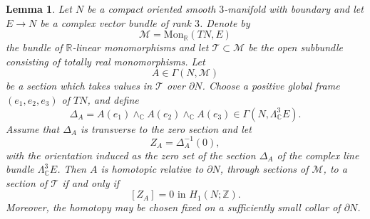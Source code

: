 \documentclass[10pt,a4paper]{amsart}
\newtheorem{lemma}{Lemma}
\newcommand{\C}{\mathbb{C}}
\newcommand\Mon{\mathrm{Mon}}
\newcommand{\R}{\mathbb{R}}
\newcommand{\Z}{\mathbb{Z}}
\newcommand{\cM}{\mathcal{M}}
\newcommand{\cT}{\mathcal{T}}
\begin{document}
\begin{lemma}\label{lemma}
Let $N$ be a compact oriented smooth $3$-manifold with boundary and let $E\to N$ be a complex vector bundle of rank $3$. Denote by 
\[\cM=\Mon_{\R}(TN,E)\] 
the bundle of $\R$-linear monomorphisms and let $\cT\subset \cM$ be the open subbundle consisting of totally real monomorphisms. Let
\[A\in \Gamma(N,\mathcal M)\]
be a section which takes values in $\cT$ over $\partial N$.  Choose a positive global frame $(e_1,e_2,e_3)$ of $TN$, and define
\[\Delta_A=A(e_1)\wedge_{\C} A(e_2)\wedge_{\C} A(e_3)
        \in \Gamma\left(N,\Lambda^3_{\C}E\right).\]
Assume that $\Delta_A$ is transverse to the zero section and let
\[Z_A=\Delta_A^{-1}(0),\]
with the orientation induced as the zero set of the section $\Delta_A$ of the complex line bundle $\Lambda^3_{\C}E$. 
Then $A$ is homotopic relative to $\partial N$, through sections of $\mathcal M$, to a section of $\mathcal T$ if and only if 
\[[Z_A]=0 \text{\ in\ } H_1(N;\Z).\]
Moreover, the homotopy may be chosen fixed on a sufficiently small collar of $\partial N$.
\end{lemma}
\end{document}
